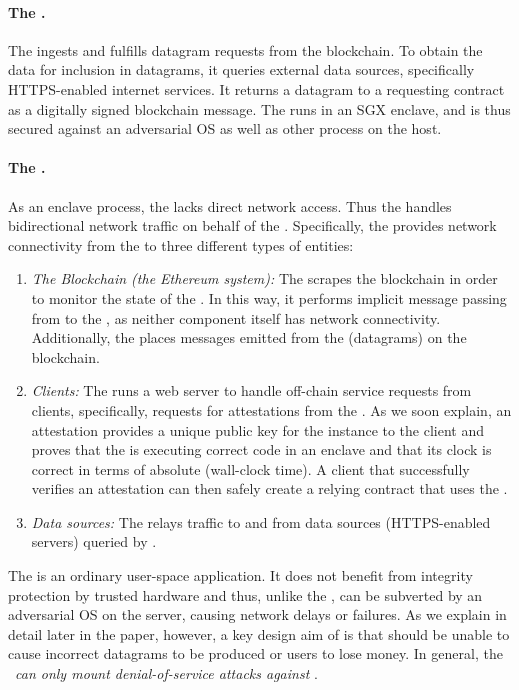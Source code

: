 \paragraph{The \encname.}
The \encname ingests and fulfills datagram requests from the blockchain. To obtain the data for inclusion in datagrams, it queries external data sources, specifically HTTPS-enabled internet services. It returns a datagram to a requesting contract \reqcont as a digitally signed blockchain message. The \encname runs in an SGX enclave, and is thus secured against an adversarial OS as well as other process on the host. 

\paragraph{The \medname.} As an enclave process, the \encname lacks direct network access. Thus the \medname handles bidirectional network traffic on behalf of the \encname. Specifically, the \medname provides network connectivity from the \encname to three different types of entities: 

\begin{enumerate}
\item {\em The Blockchain (the Ethereum system):}  The \medname scrapes the blockchain in order to monitor the state of the \tcontract  \tcont. In this way, it performs implicit message passing from \tcont to the \encname, as neither component itself has network connectivity. Additionally, the \medname places messages emitted from the \encname (datagrams) on the blockchain.
\item {\em Clients:} The \medname runs a web server to handle off-chain service requests from clients, specifically, requests for attestations from the \encname. As we soon explain, an attestation provides a unique public key for the \encname instance to the  client and proves that the \encname is executing correct code in an enclave and that its clock is correct in terms of absolute (wall-clock time). A client that successfully verifies an attestation can then safely create a relying contract \reqcont that uses the \tc.
\item {\em Data sources:} The \medname relays traffic to and from data sources (HTTPS-enabled servers) queried by \encname. 
\end{enumerate}

The \medname is an ordinary user-space application. It does not benefit from integrity protection by trusted hardware and thus, unlike the \encname, can be subverted by an adversarial OS on the \tc server, causing network delays or failures. As we explain in detail later in the paper, however, a key design aim of \tc is that \medname should be unable to cause incorrect datagrams to be produced or users to lose money. In general, the \medname~{\em can only mount denial-of-service attacks against \tc}. 

